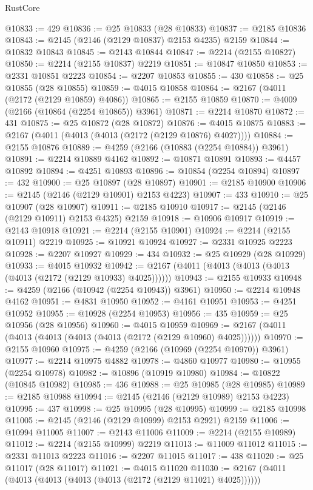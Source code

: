 \begin{lexlean}{RustCore}
\begin{coremodule}
@10833 := 429
@10836 := @25 @10833 (@28 @10833)
@10837 := @2185 @10836
@10843 := @2145 (@2146 (@2129 @10837) @2153 @4235) @2159
@10844 := @10832 @10843
@10845 := @2143 @10844
@10847 := @2214 (@2155 @10827)
@10850 := @2214 (@2155 @10837) @2219
@10851 := @10847 @10850
@10853 := @2331 @10851 @2223
@10854 := @2207 @10853
@10855 := 430
@10858 := @25 @10855 (@28 @10855)
@10859 := @4015 @10858
@10864 := @2167 (@4011 (@2172 (@2129 @10859) @4086))
@10865 := @2155 @10859
@10870 := @4009 (@2166 (@10864 (@2254 @10865)) @3961)
@10871 := @2214 @10870
@10872 := 431
@10875 := @25 @10872 (@28 @10872)
@10876 := @4015 @10875
@10883 := @2167 (@4011 (@4013 (@4013 (@2172 (@2129 @10876) @4027))))
@10884 := @2155 @10876
@10889 := @4259 (@2166 (@10883 (@2254 @10884)) @3961)
@10891 := @2214 @10889 @4162
@10892 := @10871 @10891
@10893 := @4457 @10892
@10894 := @4251 @10893
@10896 := @10854 (@2254 @10894)
@10897 := 432
@10900 := @25 @10897 (@28 @10897)
@10901 := @2185 @10900
@10906 := @2145 (@2146 (@2129 @10901) @2153 @4223)
@10907 := 433
@10910 := @25 @10907 (@28 @10907)
@10911 := @2185 @10910
@10917 := @2145 (@2146 (@2129 @10911) @2153 @4325) @2159
@10918 := @10906 @10917
@10919 := @2143 @10918
@10921 := @2214 (@2155 @10901)
@10924 := @2214 (@2155 @10911) @2219
@10925 := @10921 @10924
@10927 := @2331 @10925 @2223
@10928 := @2207 @10927
@10929 := 434
@10932 := @25 @10929 (@28 @10929)
@10933 := @4015 @10932
@10942 := @2167 (@4011 (@4013 (@4013 (@4013 (@4013 (@2172 (@2129 @10933) @4025))))))
@10943 := @2155 @10933
@10948 := @4259 (@2166 (@10942 (@2254 @10943)) @3961)
@10950 := @2214 @10948 @4162
@10951 := @4831 @10950
@10952 := @4161 @10951
@10953 := @4251 @10952
@10955 := @10928 (@2254 @10953)
@10956 := 435
@10959 := @25 @10956 (@28 @10956)
@10960 := @4015 @10959
@10969 := @2167 (@4011 (@4013 (@4013 (@4013 (@4013 (@2172 (@2129 @10960) @4025))))))
@10970 := @2155 @10960
@10975 := @4259 (@2166 (@10969 (@2254 @10970)) @3961)
@10977 := @2214 @10975 @4882
@10978 := @4860 @10977
@10980 := @10955 (@2254 @10978)
@10982 := @10896 (@10919 @10980)
@10984 := @10822 (@10845 @10982)
@10985 := 436
@10988 := @25 @10985 (@28 @10985)
@10989 := @2185 @10988
@10994 := @2145 (@2146 (@2129 @10989) @2153 @4223)
@10995 := 437
@10998 := @25 @10995 (@28 @10995)
@10999 := @2185 @10998
@11005 := @2145 (@2146 (@2129 @10999) @2153 @2921) @2159
@11006 := @10994 @11005
@11007 := @2143 @11006
@11009 := @2214 (@2155 @10989)
@11012 := @2214 (@2155 @10999) @2219
@11013 := @11009 @11012
@11015 := @2331 @11013 @2223
@11016 := @2207 @11015
@11017 := 438
@11020 := @25 @11017 (@28 @11017)
@11021 := @4015 @11020
@11030 := @2167 (@4011 (@4013 (@4013 (@4013 (@4013 (@2172 (@2129 @11021) @4025))))))

\end{coremodule}
\end{lexlean}

